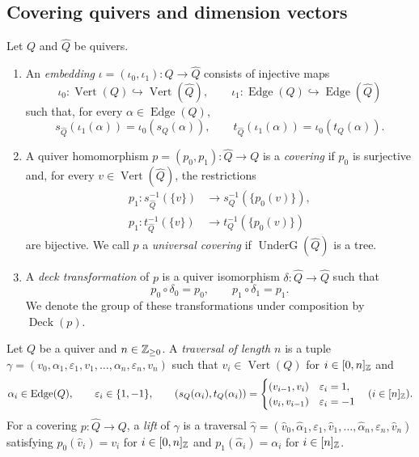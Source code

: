 \subsection{Covering quivers and dimension vectors}\label{subsec:cover-definitions}
\begin{definition}\label{def:quiver-covering}
Let $Q$ and $\widehat Q$ be quivers. 
\begin{enumerate}[font=\itshape]
\item An \textit{embedding} $\iota=(\iota_0,\iota_1):Q\to\widehat Q$ consists of injective maps
\[
 \iota_0:\operatorname{Vert}(Q)\hookrightarrow\operatorname{Vert}(\widehat Q),\qquad
 \iota_1:\operatorname{Edge}(Q)\hookrightarrow\operatorname{Edge}(\widehat Q)
\]
such that, for every $\alpha\in\operatorname{Edge}(Q)$,
\[
 s_{\widehat Q}(\iota_1(\alpha))=\iota_0(s_Q(\alpha)),\qquad
 t_{\widehat Q}(\iota_1(\alpha))=\iota_0(t_Q(\alpha)).
\]
\item A quiver homomorphism $p=(p_0,p_1):\widehat Q\to Q$ is a \textit{covering}
if $p_0$ is surjective and, for every $v\in\operatorname{Vert}(\widehat Q)$, the restrictions
\[
\begin{aligned}
 p_1:s_{\widehat Q}^{-1}(\{v\})&\longrightarrow s_Q^{-1}(\{p_0(v)\}),\\
 p_1:t_{\widehat Q}^{-1}(\{v\})&\longrightarrow t_Q^{-1}(\{p_0(v)\})
\end{aligned}
\]
are bijective.
We call $p$ a \textit{universal covering} if $\operatorname{UnderG}(\widehat Q)$ is a tree.
\item A \textit{deck transformation} of $p$ is a quiver isomorphism
$\delta:\widehat Q\to\widehat Q$ such that
\[
 p_0\circ\delta_0=p_0,\qquad p_1\circ\delta_1=p_1.
\]
We denote the group of these transformations under composition by $\operatorname{Deck}(p)$.
\end{enumerate}
\end{definition}

\begin{definition}\label{def:path-lift}
Let $Q$ be a quiver and $n\in\mathbb Z_{\ge0}$. A \textit{traversal of length $n$} is a tuple
$\gamma=(v_0,\alpha_1,\varepsilon_1,v_1,\ldots,\alpha_n,\varepsilon_n,v_n)$ such that
$v_i\in\operatorname{Vert}(Q)$ for $i\in[0,n]_{\mathbb Z}$ and
\[
 \alpha_i\in\operatorname{Edge}(Q),\qquad \varepsilon_i\in\{1,-1\},\qquad
 (s_Q(\alpha_i),t_Q(\alpha_i))=
 \begin{cases}(v_{i-1},v_i)&\varepsilon_i=1,\\(v_i,v_{i-1})&\varepsilon_i=-1\end{cases}
 \quad(i\in[n]_{\mathbb Z}).
\]
For a covering $p:\widehat Q\to Q$, a \textit{lift} of $\gamma$ is a traversal
$\widehat\gamma=(\widehat v_0,\widehat\alpha_1,\varepsilon_1,\widehat v_1,\ldots,\widehat\alpha_n,\varepsilon_n,\widehat v_n)$
satisfying $p_0(\widehat v_i)=v_i$ for $i\in[0,n]_{\mathbb Z}$ and $p_1(\widehat\alpha_i)=\alpha_i$ for $i\in[n]_{\mathbb Z}$.
\end{definition}

